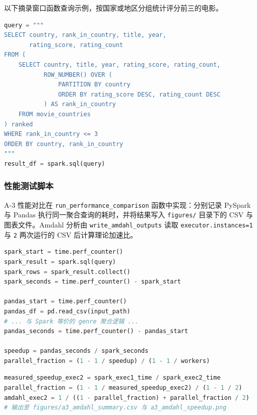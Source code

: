 以下摘录窗口函数查询示例，按国家或地区分组统计评分前三的电影。

\begin{lstlisting}[language=Python, caption={analysis.py 窗口函数查询（Query 4 节选）}, label=lst:analysis-sql]
query = """
SELECT country, rank_in_country, title, year,
       rating_score, rating_count
FROM (
    SELECT country, title, year, rating_score, rating_count,
           ROW_NUMBER() OVER (
               PARTITION BY country
               ORDER BY rating_score DESC, rating_count DESC
           ) AS rank_in_country
    FROM movie_countries
) ranked
WHERE rank_in_country <= 3
ORDER BY country, rank_in_country
"""
result_df = spark.sql(query)
\end{lstlisting}

\subsubsection{性能测试脚本}

A-3 性能对比在 \verb|run_performance_comparison| 函数中实现：分别记录 PySpark 与 Pandas 执行同一聚合查询的耗时，并将结果写入 \verb|figures/| 目录下的 CSV 与图表文件。Amdahl 分析由 \verb|write_amdahl_outputs| 读取 \verb|executor.instances=1| 与 \verb|2| 两次运行的 CSV 后计算理论加速比。

\begin{lstlisting}[language=Python, caption={analysis.py 性能对比计时逻辑（节选）}, label=lst:analysis-perf]
spark_start = time.perf_counter()
spark_result = spark.sql(query)
spark_rows = spark_result.collect()
spark_seconds = time.perf_counter() - spark_start

pandas_start = time.perf_counter()
pandas_df = pd.read_csv(input_path)
# ... 与 Spark 等价的 genre 聚合逻辑 ...
pandas_seconds = time.perf_counter() - pandas_start

speedup = pandas_seconds / spark_seconds
parallel_fraction = (1 - 1 / speedup) / (1 - 1 / workers)
\end{lstlisting}

\begin{lstlisting}[language=Python, caption={analysis.py Amdahl 汇总输出逻辑（节选）}, label=lst:analysis-amdahl]
measured_speedup_exec2 = spark_exec1_time / spark_exec2_time
parallel_fraction = (1 - 1 / measured_speedup_exec2) / (1 - 1 / 2)
amdahl_exec2 = 1 / ((1 - parallel_fraction) + parallel_fraction / 2)
# 输出至 figures/a3_amdahl_summary.csv 与 a3_amdahl_speedup.png
\end{lstlisting}

